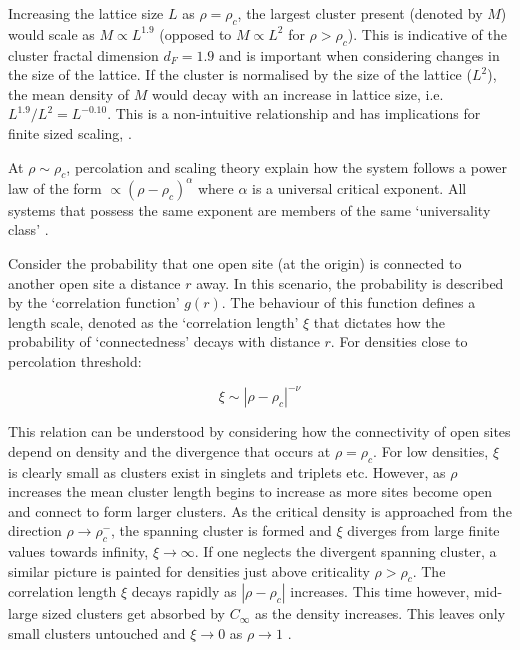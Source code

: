 Increasing the lattice size $L$ as $\rho = \rho_c$, the largest cluster present (denoted by $M$) would scale as $M\propto L^{1.9}$ (opposed to $M\propto L^{2}$ for $\rho > \rho_c$). %
This is indicative of the cluster fractal dimension $d_F=1.9$ and is important when considering changes in the size of the lattice. %
If the cluster is normalised by the size of the lattice ($L^2$), the mean density of $M$ would decay with an increase in lattice size, i.e. $L^{1.9}/L^2 = L^{-0.10}$. %
This is a non-intuitive relationship and has implications for finite sized scaling, \cite[see][p8 for more information]{stauffer2018introduction}. %

At $\rho \sim \rho_c$, percolation and scaling theory explain how the system follows a power law of the form $\propto (\rho - \rho_c)^{\alpha}$ where $\alpha$ is a universal critical exponent. %
All systems that possess the same exponent are members of the same `universality class' \citep{PhysRev.180.594, RevModPhys.76.663}. %

Consider the probability that one open site (at the origin) is connected to another open site a distance $r$ away. %
In this scenario, the probability is described by the `correlation function' $g(r)$. %
The behaviour of this function defines a length scale, denoted as the `correlation length' $\xi$ that dictates how the probability of `connectedness' decays with distance $r$. %
For densities close to percolation threshold: %

\begin{equation*}
    \xi \sim |\rho - \rho_c|^{-\nu}
\end{equation*}

This relation can be understood by considering how the connectivity of open sites depend on density and the divergence that occurs at $\rho=\rho_c$. %
For low densities, $\xi$ is clearly small as clusters exist in singlets and triplets etc. %
However, as $\rho$ increases the mean cluster length begins to increase as more sites become open and connect to form larger clusters. %
As the critical density is approached from the direction $\rho \rightarrow \rho_c^{-}$, the spanning cluster is formed and $\xi$ diverges from large finite values towards infinity, $\xi \rightarrow \infty$. %
If one neglects the divergent spanning cluster, a similar picture is painted for densities just above criticality $\rho > \rho_c$. %
The correlation length $\xi$ decays rapidly as $|\rho - \rho_c|$ increases. %
This time however,  mid-large sized clusters get absorbed by $C_\infty$ as the density increases. %
This leaves only small clusters untouched and $\xi \rightarrow 0 $ as $\rho \rightarrow 1$ \cite[see][for a detailed break-down of power laws and correlation length.]{STAUFFER19791}. %

